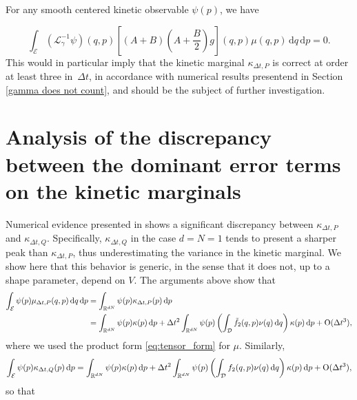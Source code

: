 \begin{conjecture}\label{conjecture}
  For any smooth centered kinetic observable $\psi(p)$, we have
  
  \begin{equation}
    \int_{\mathcal E}\left(\mathcal L_\gamma ^{-1}\psi\right)(q,p)\left[\left(A+B\right)\left(A+\frac B2\right)g\right](q,p)\mu(q,p)\,\mathrm{d}q\,\mathrm{d}p=0.
  \end{equation}
  This would in particular imply that the kinetic marginal $\kappa_{\Delta t,P}$ is correct at order at least three in~$\Delta t$, in accordance with numerical results presentend in Section \ref{gamma does not count}, and should be the subject of further investigation.
\end{conjecture}

\section{Analysis of the discrepancy between the dominant error terms on the kinetic marginals}\label{discrepancy term kinetic}
Numerical evidence presented in \cite{KK22} shows a significant discrepancy between $\kappa_{\Delta t,P}$ and $\kappa_{\Delta t,Q}$.
Specifically, $\kappa_{\Delta t,Q}$ in the case $d=N=1$ tends to present a sharper peak than $\kappa_{\Delta t,P}$, thus underestimating the variance in the kinetic marginal.
 We show here that this behavior is generic, in the sense that it does not, up to a shape parameter, depend on $V$.
The arguments above show that
\begin{equation}
  \begin{aligned}
    \int_{\mathcal E}\psi(p)\mu_{\Delta t,P}(q,p)\,\mathrm{d}q\,\mathrm{d}p&=\int_{\mathbb{R}^{dN}}\psi(p)\kappa_{\Delta t,P}(p)\,\mathrm{d}p\\
    &=\int_{\mathbb{R}^{dN}}\psi(p)\kappa(p)\,\mathrm{d}p+\Delta t^2\int_{\mathbb{R}^{dN}}\psi(p)\left(\int_{\mathcal D} \tilde f_2(q,p)\nu(q)\,\mathrm{d}q\right)\kappa(p)\,\mathrm{d}p +\mathrm{O}(\Delta t^3),  
  \end{aligned}
\end{equation}
where we used the product form \eqref{eq:tensor_form} for $\mu$. Similarly,
\begin{equation}
  \int_{\mathcal E}\psi(p)\kappa_{\Delta t,Q}(p)\,\mathrm{d}p=\int_{\mathbb{R}^{dN}}\psi(p)\kappa(p)\,\mathrm{d}p+\Delta t^2\int_{\mathbb{R}^{dN}}\psi(p)\left(\int_{\mathcal D}f_2(q,p)\nu(q)\,\mathrm{d}q\right)\kappa(p)\,\mathrm{d}p +\mathrm{O}(\Delta t^3),
\end{equation}
so that 

